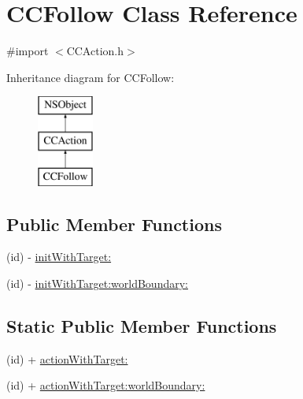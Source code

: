\hypertarget{interface_c_c_follow}{\section{C\-C\-Follow Class Reference}
\label{interface_c_c_follow}
}


{\ttfamily \#import $<$C\-C\-Action.\-h$>$}

Inheritance diagram for C\-C\-Follow\-:\begin{figure}[H]
\begin{center}
\leavevmode
\includegraphics[height=3.000000cm]{interface_c_c_follow}
\end{center}
\end{figure}
\subsection*{Public Member Functions}
\begin{DoxyCompactItemize}
\item 
(id) -\/ \hyperlink{interface_c_c_follow_ad7aacfebff2323e38f0268293890c59e}{init\-With\-Target\-:}
\item 
(id) -\/ \hyperlink{interface_c_c_follow_a2c3ec0bcb450878f417b10a0dd751e25}{init\-With\-Target\-:world\-Boundary\-:}
\end{DoxyCompactItemize}
\subsection*{Static Public Member Functions}
\begin{DoxyCompactItemize}
\item 
(id) + \hyperlink{interface_c_c_follow_a38cffdc56dc7d0a1b1942f33133e3fb4}{action\-With\-Target\-:}
\item 
(id) + \hyperlink{interface_c_c_follow_aa431e577396f063fcb032c66539c98ca}{action\-With\-Target\-:world\-Boundary\-:}
\end{DoxyCompactItemize}
